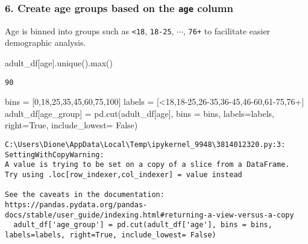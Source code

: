 \documentclass[
  letterpaper,
  DIV=11,
  numbers=noendperiod]{scrartcl}
\newenvironment{Shaded}{\begin{snugshade}}{\end{snugshade}}
\newcommand{\BuiltInTok}[1]{\textcolor[rgb]{0.00,0.23,0.31}{#1}}
\newcommand{\DecValTok}[1]{\textcolor[rgb]{0.68,0.00,0.00}{#1}}
\newcommand{\NormalTok}[1]{\textcolor[rgb]{0.00,0.23,0.31}{#1}}
\newcommand{\OperatorTok}[1]{\textcolor[rgb]{0.37,0.37,0.37}{#1}}
\newcommand{\StringTok}[1]{\textcolor[rgb]{0.13,0.47,0.30}{#1}}
\newcommand{\VariableTok}[1]{\textcolor[rgb]{0.07,0.07,0.07}{#1}}
\begin{document}
\subsubsection{\texorpdfstring{6. Create age groups based on the
\texttt{age}
column}{6. Create age groups based on the age column}}\label{create-age-groups-based-on-the-age-column}

Age is binned into groups such as \texttt{\textless{}18},
\texttt{18-25}, \(\cdots\), \texttt{76+} to facilitate easier
demographic analysis.

\begin{Shaded}
\begin{Highlighting}[]
\NormalTok{adult\_df[}\StringTok{\textquotesingle{}age\textquotesingle{}}\NormalTok{].unique().}\BuiltInTok{max}\NormalTok{()}
\end{Highlighting}
\end{Shaded}

\begin{verbatim}
90
\end{verbatim}

\begin{Shaded}
\begin{Highlighting}[]
\NormalTok{bins }\OperatorTok{=}\NormalTok{ [}\DecValTok{0}\NormalTok{,}\DecValTok{18}\NormalTok{,}\DecValTok{25}\NormalTok{,}\DecValTok{35}\NormalTok{,}\DecValTok{45}\NormalTok{,}\DecValTok{60}\NormalTok{,}\DecValTok{75}\NormalTok{,}\DecValTok{100}\NormalTok{]}
\NormalTok{labels }\OperatorTok{=}\NormalTok{ [}\StringTok{\textquotesingle{}\textless{}18\textquotesingle{}}\NormalTok{,}\StringTok{\textquotesingle{}18{-}25\textquotesingle{}}\NormalTok{,}\StringTok{\textquotesingle{}26{-}35\textquotesingle{}}\NormalTok{,}\StringTok{\textquotesingle{}36{-}45\textquotesingle{}}\NormalTok{,}\StringTok{\textquotesingle{}46{-}60\textquotesingle{}}\NormalTok{,}\StringTok{\textquotesingle{}61{-}75\textquotesingle{}}\NormalTok{,}\StringTok{\textquotesingle{}76+\textquotesingle{}}\NormalTok{]}
\NormalTok{adult\_df[}\StringTok{\textquotesingle{}age\_group\textquotesingle{}}\NormalTok{] }\OperatorTok{=}\NormalTok{ pd.cut(adult\_df[}\StringTok{\textquotesingle{}age\textquotesingle{}}\NormalTok{], bins }\OperatorTok{=}\NormalTok{ bins, labels}\OperatorTok{=}\NormalTok{labels, right}\OperatorTok{=}\VariableTok{True}\NormalTok{, include\_lowest}\OperatorTok{=} \VariableTok{False}\NormalTok{) }
\end{Highlighting}
\end{Shaded}

\begin{verbatim}
C:\Users\Dione\AppData\Local\Temp\ipykernel_9948\3814012320.py:3: SettingWithCopyWarning: 
A value is trying to be set on a copy of a slice from a DataFrame.
Try using .loc[row_indexer,col_indexer] = value instead

See the caveats in the documentation: https://pandas.pydata.org/pandas-docs/stable/user_guide/indexing.html#returning-a-view-versus-a-copy
  adult_df['age_group'] = pd.cut(adult_df['age'], bins = bins, labels=labels, right=True, include_lowest= False)
\end{verbatim}
\end{document}

